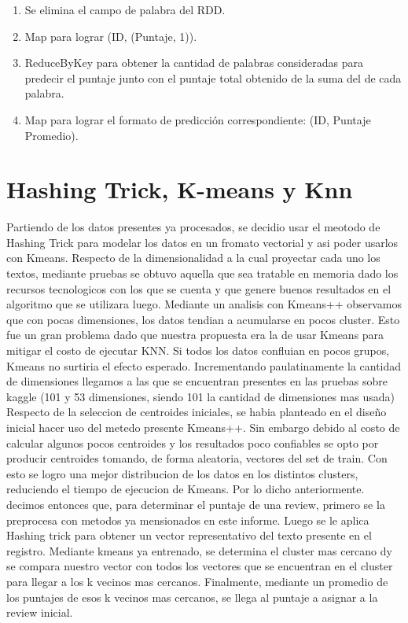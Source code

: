 \documentclass[a4paper,11pt]{report}
\begin{document}
\begin{enumerate}[1.]
    \item Se elimina el campo de palabra del RDD.
    
    \item Map para lograr (ID, (Puntaje, 1)).
    
    \item ReduceByKey para obtener la cantidad de palabras consideradas para predecir el puntaje junto con el puntaje total obtenido de la suma del de cada palabra.
    
    \item Map para lograr el formato de predicción correspondiente: (ID, Puntaje Promedio).
    
\end{enumerate}

\chapter{Hashing Trick, K-means y Knn}
Partiendo de los datos presentes ya procesados, se decidio usar el meotodo de Hashing Trick para modelar los datos en un fromato vectorial y asi poder usarlos con Kmeans. Respecto de la dimensionalidad a la cual proyectar cada uno los textos, mediante pruebas se obtuvo aquella que sea tratable en memoria dado los recursos tecnologicos con los que se cuenta y que genere buenos resultados en el algoritmo que se utilizara luego.
Mediante un analisis con Kmeans++ observamos que con pocas dimensiones, los datos tendian a acumularse en pocos cluster. Esto fue un gran problema dado que nuestra propuesta era la de usar Kmeans para mitigar el costo de ejecutar KNN. Si todos los datos confluian en pocos grupos, Kmeans no surtiria el efecto esperado. 
Incrementando paulatinamente la cantidad de dimensiones llegamos a las que se encuentran presentes en las pruebas sobre kaggle (101 y 53 dimensiones, siendo 101 la cantidad de dimensiones mas usada)
Respecto de la seleccion de centroides iniciales, se habia planteado en el diseño inicial hacer uso del metedo presente Kmeans++. Sin embargo debido al costo de calcular algunos pocos centroides y los resultados poco confiables se opto por producir centroides tomando, de forma aleatoria, vectores del set de train. Con esto se logro una mejor distribucion de los datos en los distintos clusters, reduciendo el tiempo de ejecucion de Kmeans.
Por lo dicho anteriormente. decimos entonces que, para determinar el puntaje de una review, primero se la preprocesa con metodos ya mensionados en este informe. Luego se le aplica Hashing trick para obtener un vector representativo del texto presente en el registro. Mediante kmeans ya entrenado, se determina el cluster mas cercano dy se compara nuestro vector con todos los vectores que se encuentran en el cluster para llegar a los k vecinos mas cercanos. Finalmente, mediante un promedio de los puntajes de esos k vecinos mas cercanos, se llega al puntaje a asignar a la review inicial.
\end{document}
